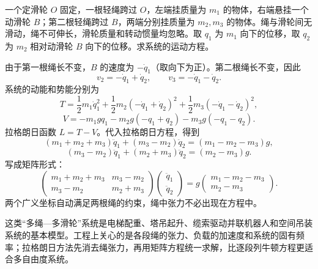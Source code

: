 \begin{example}[双滑轮三质量系统]
一个定滑轮 $O$ 固定，一根轻绳跨过 $O$，左端挂质量为 $m_1$ 的物体，右端悬挂一个动滑轮 $B$；第二根轻绳跨过 $B$，两端分别挂质量为 $m_2,m_3$ 的物体。绳与滑轮间无滑动，绳不可伸长，滑轮质量和转动惯量均忽略。取 $q_1$ 为 $m_1$ 向下的位移，取 $q_2$ 为 $m_2$ 相对动滑轮 $B$ 向下的位移。求系统的运动方程。

\begin{center}
\end{center}

由于第一根绳长不变，$B$ 的速度为 $-\dot q_1$（取向下为正）。第二根绳长不变，因此
\[
v_2=-\dot q_1+\dot q_2,
\qquad
v_3=-\dot q_1-\dot q_2.
\]
系统的动能和势能分别为
\[
T=\frac12m_1\dot q_1^2+\frac12m_2(-\dot q_1+\dot q_2)^2
+\frac12m_3(-\dot q_1-\dot q_2)^2,
\]
\[
V=-m_1gq_1-m_2g(-q_1+q_2)-m_3g(-q_1-q_2).
\]
拉格朗日函数 $L=T-V$。代入拉格朗日方程，得到
\[
(m_1+m_2+m_3)\ddot q_1+(m_3-m_2)\ddot q_2
=(m_1-m_2-m_3)g,
\]
\[
(m_3-m_2)\ddot q_1+(m_2+m_3)\ddot q_2
=(m_2-m_3)g.
\]
写成矩阵形式：
\[
\begin{pmatrix}
m_1+m_2+m_3 & m_3-m_2\\
m_3-m_2 & m_2+m_3
\end{pmatrix}
\begin{pmatrix}\ddot q_1\\ \ddot q_2\end{pmatrix}
=g\begin{pmatrix}m_1-m_2-m_3\\ m_2-m_3\end{pmatrix}.
\]
两个广义坐标自动满足两根绳的约束，绳中张力不必出现在方程中。

\begin{modernbox}
这类“多绳—多滑轮”系统是电梯配重、塔吊起升、缆索驱动并联机器人和空间吊装系统的基本模型。工程上关心的是各段绳的张力、负载的加速度和系统的固有频率；拉格朗日方法先消去绳张力，再用矩阵方程统一求解，比逐段列牛顿方程更适合多自由度系统。
\end{modernbox}
\end{example}

